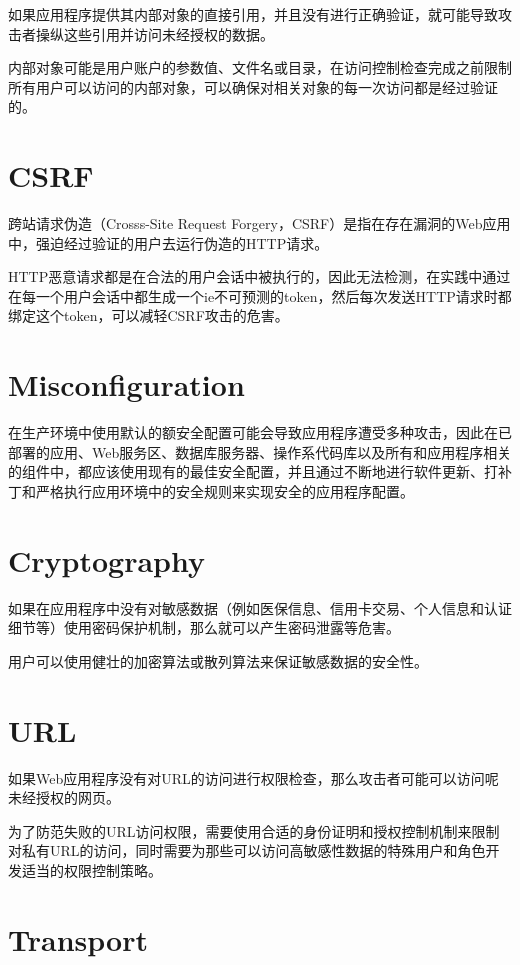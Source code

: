 如果应用程序提供其内部对象的直接引用，并且没有进行正确验证，就可能导致攻击者操纵这些引用并访问未经授权的数据。

内部对象可能是用户账户的参数值、文件名或目录，在访问控制检查完成之前限制所有用户可以访问的内部对象，可以确保对相关对象的每一次访问都是经过验证的。

\section{CSRF}

跨站请求伪造（Crosss-Site Request Forgery，CSRF）是指在存在漏洞的Web应用中，强迫经过验证的用户去运行伪造的HTTP请求。

HTTP恶意请求都是在合法的用户会话中被执行的，因此无法检测，在实践中通过在每一个用户会话中都生成一个ie不可预测的token，然后每次发送HTTP请求时都绑定这个token，可以减轻CSRF攻击的危害。

\section{Misconfiguration}

在生产环境中使用默认的额安全配置可能会导致应用程序遭受多种攻击，因此在已部署的应用、Web服务区、数据库服务器、操作系代码库以及所有和应用程序相关的组件中，都应该使用现有的最佳安全配置，并且通过不断地进行软件更新、打补丁和严格执行应用环境中的安全规则来实现安全的应用程序配置。

\section{Cryptography}

如果在应用程序中没有对敏感数据（例如医保信息、信用卡交易、个人信息和认证细节等）使用密码保护机制，那么就可以产生密码泄露等危害。

用户可以使用健壮的加密算法或散列算法来保证敏感数据的安全性。

\section{URL}

如果Web应用程序没有对URL的访问进行权限检查，那么攻击者可能可以访问呢未经授权的网页。

为了防范失败的URL访问权限，需要使用合适的身份证明和授权控制机制来限制对私有URL的访问，同时需要为那些可以访问高敏感性数据的特殊用户和角色开发适当的权限控制策略。

\section{Transport}

